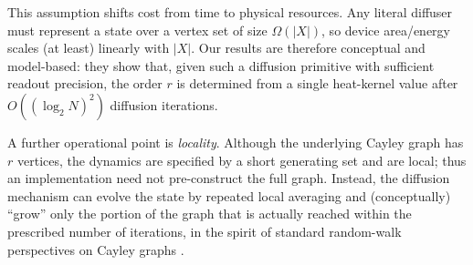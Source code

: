 \documentclass[11pt,reqno]{article}
\numberwithin{equation}{section}
\theoremstyle{plain}
\theoremstyle{definition}
\theoremstyle{remark}
\begin{document}
This assumption shifts cost from time to physical resources.  Any literal diffuser must
represent a state over a vertex set of size $\Omega(|X|)$, so device area/energy scales
(at least) linearly with $|X|$.  Our results are therefore conceptual and model-based:
they show that, given such a diffusion primitive with sufficient readout precision,
the order $r$ is determined from a single heat-kernel value after $O((\log_2 N)^2)$
diffusion iterations.

A further operational point is \emph{locality}.  Although the underlying Cayley graph has $r$ vertices, the dynamics are specified by a short generating set and are local; thus an implementation need not pre-construct the full graph.  Instead, the diffusion mechanism can evolve the state by repeated local averaging and (conceptually) ``grow'' only the portion of the graph that is actually reached within the prescribed number of iterations, in the spirit of standard random-walk perspectives on Cayley graphs \cite{LPW09,Chung97}.
\end{document}
